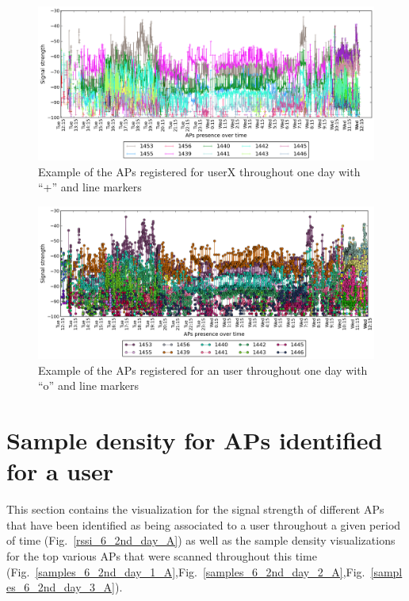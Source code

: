\begin{figure}[!h]
\centering
\includegraphics[height =
0.45\textwidth]{figures/cros_line_user_6_sorted_1days_plot.png}
\caption{Example of the APs registered for userX throughout one day with
``+'' and line markers}
\label{user_6_cross_line_1d}
\end{figure}

\begin{figure}[!h]
\centering
\includegraphics[height =
0.45\textwidth]{figures/o_line_user_6_sorted_1days_plot.png}
\caption{Example of the APs registered for an user throughout one day with
``o'' and line markers}
\label{user_6_o_line_1d}
\end{figure}

\section{Sample density for APs identified for a user}
\label{appendix_sample_density}

This section contains the visualization for the signal strength of different APs
that have been identified as being associated to a user throughout a given
period of time (Fig.~\ref{rssi_6_2nd_day_A}) as well as the sample density
visualizations for the top various APs that were scanned throughout this time
(Fig.~\ref{samples_6_2nd_day_1_A},Fig.~\ref{samples_6_2nd_day_2_A},Fig.~\ref{samples_6_2nd_day_3_A}).

